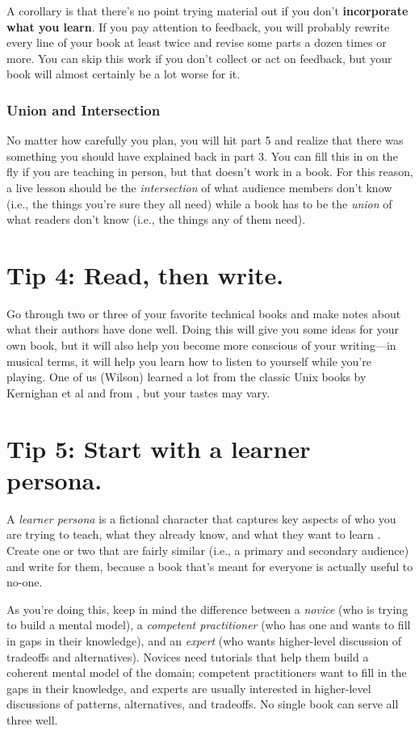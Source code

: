 \documentclass[10pt,letterpaper]{article}
\begin{document}
A corollary is that
there's no point trying material out if you don't \textbf{incorporate what you learn}.
If you pay attention to feedback,
you will probably rewrite every line of your book at least twice
and revise some parts a dozen times or more.
You can skip this work if you don't collect or act on feedback,
but your book will almost certainly be a lot worse for it.

\subsubsection*{Union and Intersection}

No matter how carefully you plan,
you will hit part 5 and realize that
there was something you should have explained back in part 3.
You can fill this in on the fly if you are teaching in person,
but that doesn't work in a book.
For this reason,
a live lesson should be the \emph{intersection} of what audience members don't know
(i.e., the things you're sure they all need)
while a book has to be the \emph{union} of what readers don't know
(i.e., the things any of them need).

\section*{Tip 4: Read, then write.}

Go through two or three of your favorite technical books
and make notes about what their authors have done well.
Doing this will give you some ideas for your own book,
but it will also help you become more conscious of your writing—in musical terms,
it will help you learn how to listen to yourself while you're playing.
One of us (Wilson) learned a lot from the classic Unix books by Kernighan et al
\cite{Ke1979,Ke1981,Ke1983,Ke1988} and from \cite{Ud1999},
but your tastes may vary.

\section*{Tip 5: Start with a learner persona.}

A \emph{learner persona} is a fictional character that captures key aspects of
who you are trying to teach,
what they already know,
and what they want to learn \cite{Wi2019}.
Create one or two that are fairly similar (i.e., a primary and secondary audience) and write for them,
because a book that's meant for everyone is actually useful to no-one.

As you're doing this,
keep in mind the difference between a \emph{novice} (who is trying to build a mental model),
a \emph{competent practitioner} (who has one and wants to fill in gaps in their knowledge),
and an \emph{expert} (who wants higher-level discussion of tradeoffs and alternatives).
Novices need tutorials that help them build a coherent mental model of the domain;
competent practitioners want to fill in the gaps in their knowledge,
and experts are usually interested in higher-level discussions of patterns, alternatives, and tradeoffs.
No single book can serve all three well.
\end{document}
